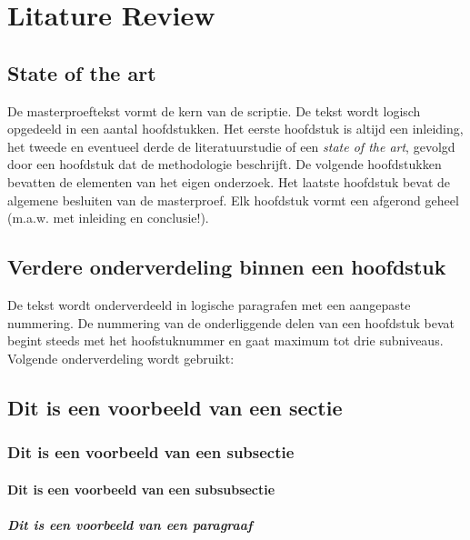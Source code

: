
\chapter{Litature Review}

\section{State of the art}
De masterproeftekst vormt de kern van de scriptie. De tekst wordt logisch opgedeeld in een aantal hoofdstukken. Het eerste hoofdstuk is altijd een inleiding, het tweede en eventueel derde de literatuurstudie of een \textit{state of the art}, gevolgd door een hoofdstuk dat de methodologie beschrijft. De volgende hoofdstukken bevatten de elementen van het eigen onderzoek. Het laatste hoofdstuk bevat de algemene besluiten van de masterproef. Elk hoofdstuk vormt een afgerond geheel (m.a.w. met inleiding en conclusie!).

\section{Verdere onderverdeling binnen een hoofdstuk}
De tekst wordt onderverdeeld in logische paragrafen met een aangepaste nummering. De nummering van de onderliggende delen van een hoofdstuk bevat begint steeds met het hoofstuknummer en gaat maximum tot drie subniveaus. 
Volgende onderverdeling wordt gebruikt:

\section{Dit is een voorbeeld van een sectie}
\subsection{Dit is een voorbeeld van een subsectie}
\subsubsection{Dit is een voorbeeld van een subsubsectie}
\paragraph{Dit is een voorbeeld van een paragraaf}